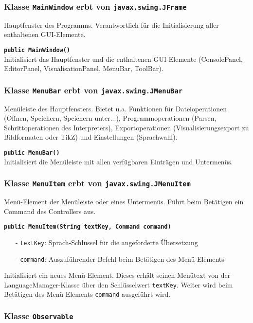 \documentclass[parskip=full,11pt,twoside]{scrartcl}
\begin{document}
\subsubsection{Klasse \texttt{MainWindow} erbt von \texttt{javax.swing.JFrame}}

Hauptfenster des Programms. Verantwortlich für die Initialisierung aller enthaltenen GUI-Elemente.

\textbf{\texttt{public MainWindow()}}\\
Initialisiert das Hauptfenster und die enthaltenen GUI-Elemente (ConsolePanel, EditorPanel, VisualisationPanel, MenuBar, ToolBar).

\subsubsection{Klasse \texttt{MenuBar} erbt von \texttt{javax.swing.JMenuBar}}

Menüleiste des Hauptfensters. Bietet u.a. Funktionen für Dateioperationen (Öffnen, Speichern, Speichern unter...), Programmoperationen (Parsen, Schrittoperationen des Interpreters), Exportoperationen (Visualisierungsexport zu Bildformaten oder TikZ) und Einstellungen (Sprachwahl).

\textbf{\texttt{public MenuBar()}}\\
Initialisiert die Menüleiste mit allen verfügbaren Einträgen und Untermenüs.

\subsubsection{Klasse \texttt{MenuItem} erbt von \texttt{javax.swing.JMenuItem}}

Menü-Element der Menüleiste oder eines Untermenüs. Führt beim Betätigen ein Command des Controllers aus.

\textbf{\texttt{public MenuItem(String textKey, Command command)}}
\begin{itemize}[noitemsep]
	\item[-] \texttt{textKey}: Sprach-Schlüssel für die angeforderte Übersetzung
	\item[-] \texttt{command}: Auszuführender Befehl beim Betätigen des Menü-Elements
\end{itemize}
Initialisiert ein neues Menü-Element. Dieses erhält seinen Menütext von der LanguageManager-Klasse über den Schlüsselwert \texttt{textKey}. Weiter wird beim Betätigen des Menü-Elements \texttt{command} ausgeführt wird.

\subsubsection{Klasse \texttt{Observable}}
\end{document}
